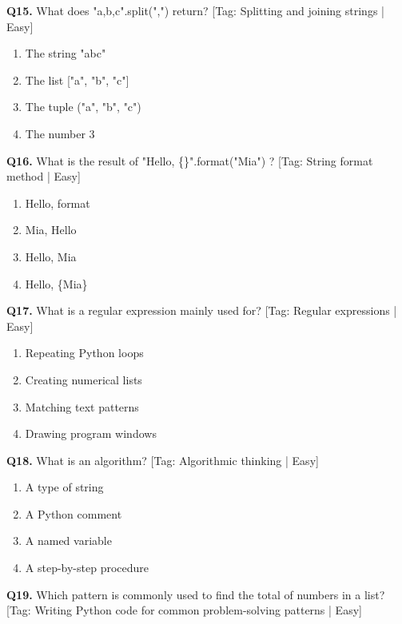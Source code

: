 \vspace{2mm}
\noindent\textbf{Q15.} What does "a,b,c".split(",") return? \hfill [Tag: Splitting and joining strings | Easy]
\begin{enumerate}[label=(\alph*),topsep=2pt,itemsep=1pt,partopsep=0pt,parsep=0pt]
    \item {The string "abc"}
    \item {The list ["a", "b", "c"]}
    \item {The tuple ("a", "b", "c")}
    \item {The number 3}
\end{enumerate}
\vspace{2mm}
\noindent\textbf{Q16.} What is the result of "Hello, \{\}".format("Mia") ? \hfill [Tag: String format method | Easy]
\begin{enumerate}[label=(\alph*),topsep=2pt,itemsep=1pt,partopsep=0pt,parsep=0pt]
    \item {Hello, format}
    \item {Mia, Hello}
    \item {Hello, Mia}
    \item {Hello, \{Mia\}}
\end{enumerate}
\vspace{2mm}
\noindent\textbf{Q17.} What is a regular expression mainly used for? \hfill [Tag: Regular expressions | Easy]
\begin{enumerate}[label=(\alph*),topsep=2pt,itemsep=1pt,partopsep=0pt,parsep=0pt]
    \item {Repeating Python loops}
    \item {Creating numerical lists}
    \item {Matching text patterns}
    \item {Drawing program windows}
\end{enumerate}
\vspace{2mm}
\noindent\textbf{Q18.} What is an algorithm? \hfill [Tag: Algorithmic thinking | Easy]
\begin{enumerate}[label=(\alph*),topsep=2pt,itemsep=1pt,partopsep=0pt,parsep=0pt]
    \item {A type of string}
    \item {A Python comment}
    \item {A named variable}
    \item {A step-by-step procedure}
\end{enumerate}
\vspace{2mm}
\noindent\textbf{Q19.} Which pattern is commonly used to find the total of numbers in a list? \hfill [Tag: Writing Python code for common problem-solving patterns | Easy]
